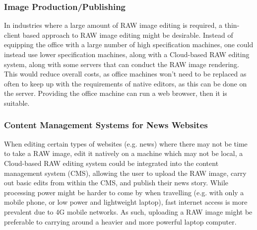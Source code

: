 \documentclass[10pt,a4paper]{article}
\begin{document}

\subsubsection{Image Production/Publishing}
In industries where a large amount of RAW image editing is required, a thin-client based approach to RAW image editing might be desirable.
Instead of equipping the office with a large number of high specification machines, one could instead use lower specification machines,
along with a Cloud-based RAW editing system, along with some servers that can conduct the RAW image rendering. This would reduce overall costs,
as office machines won't need to be replaced as often to keep up with the requirements of native editors, as this can be done on the server. 
Providing the office machine can run a web browser, then it is suitable.

\subsubsection{Content Management Systems for News Websites}
When editing certain types of websites (e.g. news) where there may not be time to take a RAW image, edit it natively on a machine
which may not be local, a Cloud-based RAW editing system could be integrated into the content management system (CMS), allowing the user
to upload the RAW image, carry out basic edits from within the CMS, and publish their news story. While processing power might be harder to
come by when travelling (e.g. with only a mobile phone, or low power and lightweight laptop), fast internet access is more prevalent due to
4G mobile networks. As such, uploading a RAW image might be preferable to carrying around a heavier and more powerful laptop computer.
\end{document}
